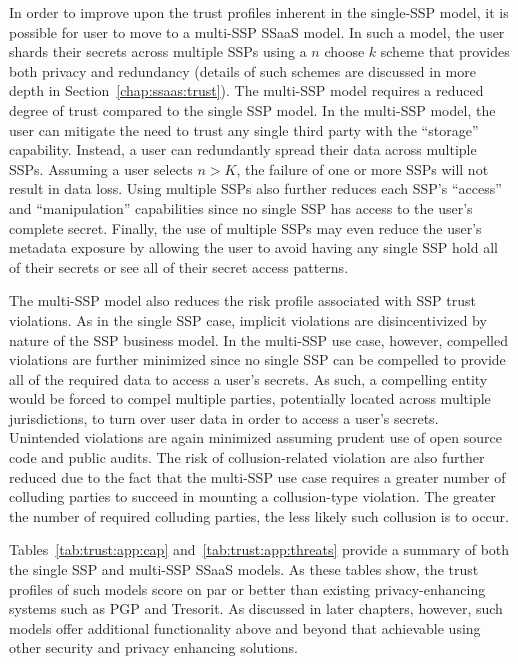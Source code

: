 In order to improve upon the trust profiles inherent in the single-SSP
model, it is possible for user to move to a multi-SSP SSaaS model. In
such a model, the user shards their secrets across multiple SSPs using
a $n$ choose $k$ scheme that provides both privacy and redundancy
(details of such schemes are discussed in more depth in
Section~\ref{chap:ssaas:trust}). The multi-SSP model requires a
reduced degree of trust compared to the single SSP model. In the
multi-SSP model, the user can mitigate the need to trust any single
third party with the ``storage'' capability. Instead, a user can
redundantly spread their data across multiple SSPs. Assuming a user
selects $n > K$, the failure of one or more SSPs will not result in
data loss. Using multiple SSPs also further reduces each SSP's
``access'' and ``manipulation'' capabilities since no single SSP has
access to the user's complete secret. Finally, the use of multiple
SSPs may even reduce the user's metadata exposure by allowing the user
to avoid having any single SSP hold all of their secrets or see all of
their secret access patterns.

The multi-SSP model also reduces the risk profile associated with SSP
trust violations. As in the single SSP case, implicit violations are
disincentivized by nature of the SSP business model. In the multi-SSP
use case, however, compelled violations are further minimized since no
single SSP can be compelled to provide all of the required data to
access a user's secrets. As such, a compelling entity would be forced
to compel multiple parties, potentially located across multiple
jurisdictions, to turn over user data in order to access a user's
secrets. Unintended violations are again minimized assuming prudent
use of open source code and public audits. The risk of
collusion-related violation are also further reduced due to the fact
that the multi-SSP use case requires a greater number of colluding
parties to succeed in mounting a collusion-type violation. The greater
the number of required colluding parties, the less likely such
collusion is to occur.

Tables~\ref{tab:trust:app:cap} and~\ref{tab:trust:app:threats} provide
a summary of both the single SSP and multi-SSP SSaaS models. As these
tables show, the trust profiles of such models score on par or better
than existing privacy-enhancing systems such as PGP and Tresorit. As
discussed in later chapters, however, such models offer additional
functionality above and beyond that achievable using other security
and privacy enhancing solutions.

